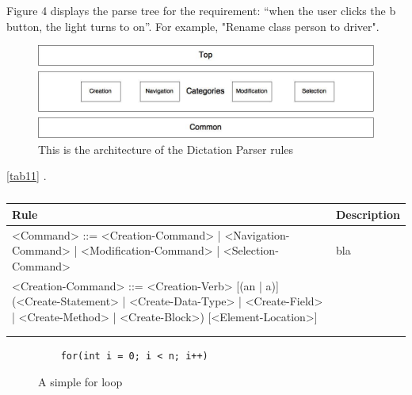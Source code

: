 Figure 4 displays the parse tree for the requirement: “when the user clicks the
b button, the light turns to on”. For example, "Rename class person to driver".
\begin{figure}[H]
\centering
\includegraphics[scale=0.4]{./fig/BNFDiagram}
\caption{This is the architecture of the Dictation Parser rules}
\label{fig19}
\end{figure}
\autoref{tab11} .
\begin{table}[H]
	\centering
	\label{my-label}
	\begin{tabular}{|p{10cm}|p{6cm}|}
		\hline
		\rowcolor[HTML]{9B9B9B} 
		{\color[HTML]{000000} Rule} & {\color[HTML]{000000} Description} \\ \hline
		<Command> ::= <Creation-Command> | <Navigation-Command> | <Modification-Command> | <Selection-Command>& bla \\ \hline
		<Creation-Command> ::= <Creation-Verb> [(an | a)] (<Create-Statement> | <Create-Data-Type> | <Create-Field> | <Create-Method> | <Create-Block>) [<Element-Location>]&     \\ \hline
		&     \\ \hline
		&     \\ \hline
	\end{tabular}
	\caption{}
	\label{tab11}
\end{table}

\begin{figure}[H]
	\begin{lstlisting}
	for(int i = 0; i < n; i++)
	\end{lstlisting}
	\caption{A simple for loop}
	\label{fig20}
\end{figure}